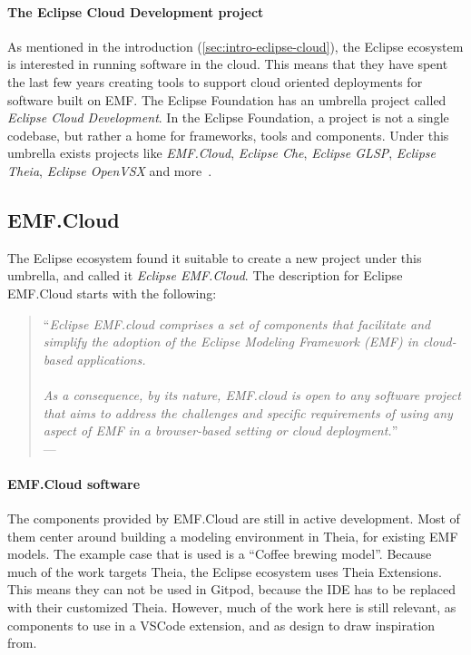 \paragraph{The Eclipse Cloud Development project}
As mentioned in the introduction (\cref{sec:intro-eclipse-cloud}), the Eclipse ecosystem is interested in running software in the \gls{cloud}.
This means that they have spent the last few years creating tools to support \gls{cloud} oriented deployments for software built on \acrlong{EMF}.
The Eclipse Foundation has an umbrella project called \textit{Eclipse Cloud Development}.
In the Eclipse Foundation, a project is not a single codebase, but rather a home for frameworks, tools and components.
Under this umbrella exists projects like \textit{EMF.Cloud}, \textit{Eclipse Che}, \textit{Eclipse GLSP}, \textit{Eclipse Theia}, \textit{Eclipse OpenVSX} and more~\cite{beatonEclipseCloudDevelopment2014}.

\subsection{EMF.Cloud}
The Eclipse ecosystem found it suitable to create a new project under this umbrella, and called it \textit{Eclipse EMF.Cloud}.
The description for Eclipse EMF.Cloud starts with the following:
\begin{quote}
  ``\textit{Eclipse EMF.cloud comprises a set of components that facilitate and simplify the adoption of the Eclipse Modeling Framework (EMF) in cloud-based applications.\\
  \textelp{}\\
  As a consequence, by its nature, EMF.cloud is open to any software project that aims to address the challenges and specific requirements of using any aspect of EMF in a browser-based setting or cloud deployment.}''\\
  ---~\textcite{smithEclipseEMFCloud2019}
\end{quote}

\paragraph{EMF.Cloud software}
The components provided by EMF.Cloud are still in active development.
Most of them center around building a modeling environment in \gls{Theia}, for existing \acrshort{EMF} models.
The example case that is used is a ``Coffee brewing model''.
Because much of the work targets Theia, the Eclipse ecosystem uses Theia Extensions.
This means they can not be used in \gls{Gitpod}, because the \acrshort{IDE} has to be replaced with their customized Theia.
However, much of the work here is still relevant, as components to use in a \gls{VSCode} extension, and as design to draw inspiration from.\\

